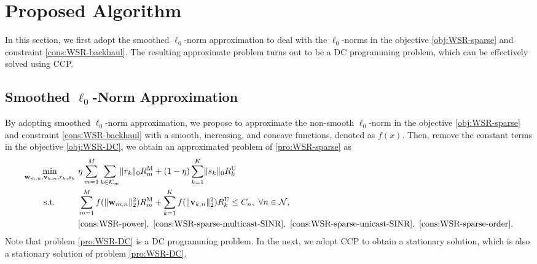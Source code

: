 \documentclass[12pt, draftclsnofoot, onecolumn]{IEEEtran}
\begin{document}
\section{Proposed Algorithm}
In this section, we first adopt the smoothed $\ell_0$-norm approximation to deal with the $\ell_0$-norms in the objective \eqref{obj:WSR-sparse} and constraint \eqref{cons:WSR-backhaul}. The resulting approximate problem turns out to be a DC programming problem, which can be effectively solved using CCP.

\subsection{Smoothed $\ell_0$-Norm Approximation}
By adopting smoothed $\ell_0$-norm approximation, we propose to approximate the non-smooth $\ell_0$-norm in the objective \eqref{obj:WSR-sparse} and constraint \eqref{cons:WSR-backhaul} with a smooth, increasing, and concave functions, denoted as $f(x)$. 
Then, remove the constant terms in the objective \eqref{obj:WSR-DC}, we obtain an approximated problem of \eqref{pro:WSR-sparse} as
\begin{subequations}
\begin{align} 
\mathop{\text{min}}_{\mathbf{w}_{m,n}, \mathbf{v}_{k,n}, r_{k}, s_{k}} ~& \eta \sum_{m=1}^M \sum_{k \in \mathcal{K}_m} \lVert r_{k} \lVert_0  R_{m}^{\text{M}} + (1 - \eta) \sum_{k=1}^K \lVert s_{k} \lVert_0 R_k^{\text{U}} \label{obj:WSR-DC} \\ 
\text{s.t.} \qquad ~~& \sum_{m=1}^M f(\lVert \mathbf{w}_{m,n} \rVert_2^2) R_{m}^{\text{M}} + \sum_{k=1}^K f(\lVert \mathbf{v}_{k,n} \rVert_2^2) R_k^{\text{U}} \leq C_n,~\forall n \in \mathcal{N}, \label{cons:WSR-DC-backhaul}\\
& \eqref{cons:WSR-power},~\eqref{cons:WSR-sparse-multicast-SINR},~\eqref{cons:WSR-sparse-unicast-SINR},~\eqref{cons:WSR-sparse-order}. \nonumber
\end{align} \label{pro:WSR-DC}
\end{subequations}
Note that problem \eqref{pro:WSR-DC} is a DC programming problem. In the next, we adopt CCP to obtain a stationary solution, which is also a stationary solution of problem \eqref{pro:WSR-DC}.
\end{document}
